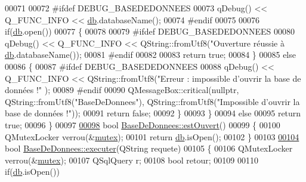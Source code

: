 \begin{DoxyCode}
00071 
00072 \textcolor{preprocessor}{       #ifdef DEBUG\_BASEDEDONNEES}
00073        qDebug() << Q\_FUNC\_INFO << \hyperlink{class_base_de_donnees_a3e738dcf443370c46a541677ab619f06}{db}.databaseName();
00074 \textcolor{preprocessor}{        #endif}
00075 
00076        \textcolor{keywordflow}{if}(\hyperlink{class_base_de_donnees_a3e738dcf443370c46a541677ab619f06}{db}.open())
00077        \{
00078 
00079 \textcolor{preprocessor}{           #ifdef DEBUG\_BASEDEDONNEES}
00080            qDebug() << Q\_FUNC\_INFO << QString::fromUtf8(\textcolor{stringliteral}{"Ouverture réussie à %
      \hyperlink{class_base_de_donnees_a3e738dcf443370c46a541677ab619f06}{db}.databaseName());
00081 \textcolor{preprocessor}{           #endif}
00082 
00083            \textcolor{keywordflow}{return} \textcolor{keyword}{true};
00084        \}
00085        \textcolor{keywordflow}{else}
00086        \{
00087 \textcolor{preprocessor}{           #ifdef DEBUG\_BASEDEDONNEES}
00088            qDebug() << Q\_FUNC\_INFO << QString::fromUtf8(\textcolor{stringliteral}{"Erreur : impossible d'ouvrir la base de données !"}
      );
00089 \textcolor{preprocessor}{           #endif}
00090            QMessageBox::critical(\textcolor{keyword}{nullptr}, QString::fromUtf8(\textcolor{stringliteral}{"BaseDeDonnees"}), QString::fromUtf8(\textcolor{stringliteral}{"Impossible
       d'ouvrir la base de données !"}));
00091            \textcolor{keywordflow}{return} \textcolor{keyword}{false};
00092        \}
00093     \}
00094     \textcolor{keywordflow}{else}
00095         \textcolor{keywordflow}{return} \textcolor{keyword}{true};
00096 \}
00097 
\hyperlink{class_base_de_donnees_af9ac332082ffd0dd35e412cefabe5e9c}{00098} \textcolor{keywordtype}{bool} \hyperlink{class_base_de_donnees_af9ac332082ffd0dd35e412cefabe5e9c}{BaseDeDonnees::estOuvert}()
00099 \{
00100     QMutexLocker verrou(&\hyperlink{class_base_de_donnees_aa1b4696fac87a740f914aa73739086f2}{mutex});
00101     \textcolor{keywordflow}{return} \hyperlink{class_base_de_donnees_a3e738dcf443370c46a541677ab619f06}{db}.isOpen();
00102 \}
00103 
\hyperlink{class_base_de_donnees_aa8de5f8f8bb17edc43f5c0ee33712081}{00104} \textcolor{keywordtype}{bool} \hyperlink{class_base_de_donnees_aa8de5f8f8bb17edc43f5c0ee33712081}{BaseDeDonnees::executer}(QString requete)
00105 \{
00106     QMutexLocker verrou(&\hyperlink{class_base_de_donnees_aa1b4696fac87a740f914aa73739086f2}{mutex});
00107     QSqlQuery r;
00108     \textcolor{keywordtype}{bool} retour;
00109 
00110     \textcolor{keywordflow}{if}(\hyperlink{class_base_de_donnees_a3e738dcf443370c46a541677ab619f06}{db}.isOpen())
}
\end{DoxyCode}
